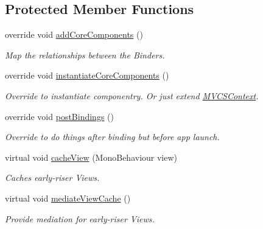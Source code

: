 \subsection*{Protected Member Functions}
\begin{DoxyCompactItemize}
\item 
override void \hyperlink{classstrange_1_1extensions_1_1context_1_1impl_1_1_m_v_c_s_context_aad55996545681bce820c04f1b8ba7b04}{add\-Core\-Components} ()
\begin{DoxyCompactList}\small\item\em Map the relationships between the Binders. \end{DoxyCompactList}\item 
\hypertarget{classstrange_1_1extensions_1_1context_1_1impl_1_1_m_v_c_s_context_ae5ebe51ca346da989b9de8e6a67a2216}{override void \hyperlink{classstrange_1_1extensions_1_1context_1_1impl_1_1_m_v_c_s_context_ae5ebe51ca346da989b9de8e6a67a2216}{instantiate\-Core\-Components} ()}\label{classstrange_1_1extensions_1_1context_1_1impl_1_1_m_v_c_s_context_ae5ebe51ca346da989b9de8e6a67a2216}

\begin{DoxyCompactList}\small\item\em Override to instantiate componentry. Or just extend \hyperlink{classstrange_1_1extensions_1_1context_1_1impl_1_1_m_v_c_s_context}{M\-V\-C\-S\-Context}. \end{DoxyCompactList}\item 
\hypertarget{classstrange_1_1extensions_1_1context_1_1impl_1_1_m_v_c_s_context_ad19904014e8c427ab02f7ac94fecceb2}{override void \hyperlink{classstrange_1_1extensions_1_1context_1_1impl_1_1_m_v_c_s_context_ad19904014e8c427ab02f7ac94fecceb2}{post\-Bindings} ()}\label{classstrange_1_1extensions_1_1context_1_1impl_1_1_m_v_c_s_context_ad19904014e8c427ab02f7ac94fecceb2}

\begin{DoxyCompactList}\small\item\em Override to do things after binding but before app launch. \end{DoxyCompactList}\item 
virtual void \hyperlink{classstrange_1_1extensions_1_1context_1_1impl_1_1_m_v_c_s_context_aec7fc8d5e39c2e005410412e5c20c182}{cache\-View} (Mono\-Behaviour view)
\begin{DoxyCompactList}\small\item\em Caches early-\/riser Views. \end{DoxyCompactList}\item 
\hypertarget{classstrange_1_1extensions_1_1context_1_1impl_1_1_m_v_c_s_context_abb0ebe5ae03d434da56eece8a20be876}{virtual void \hyperlink{classstrange_1_1extensions_1_1context_1_1impl_1_1_m_v_c_s_context_abb0ebe5ae03d434da56eece8a20be876}{mediate\-View\-Cache} ()}\label{classstrange_1_1extensions_1_1context_1_1impl_1_1_m_v_c_s_context_abb0ebe5ae03d434da56eece8a20be876}

\begin{DoxyCompactList}\small\item\em Provide mediation for early-\/riser Views. \end{DoxyCompactList}\end{DoxyCompactItemize}
